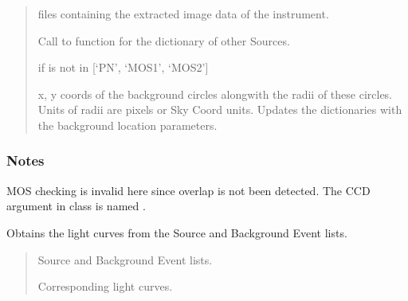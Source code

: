 \documentclass[letterpaper,10pt,english]{sphinxmanual}
\begin{document}
\begin{fulllineitems}
\begin{fulllineitems}
\begin{quote}
\begin{description}
\sphinxAtStartPar
{} files containing the extracted image data of the instrument.

\sphinxAtStartPar
Call to  function for the dictionary of
other Sources.

\sphinxAtStartPar
{} \textendash{} if  is not in {[}‘PN’, ‘MOS1’, ‘MOS2’{]}

\sphinxAtStartPar
x, y coords of the background circles alongwith the radii of these circles.
Units of radii are pixels or Sky Coord units.
Updates the  dictionaries with the background location
parameters.

\end{description}\end{quote}
\subsubsection*{Notes}

\sphinxAtStartPar
{} MOS checking is invalid here since overlap is not been detected.
The CCD argument in  class is named .

\end{fulllineitems}


\begin{fulllineitems}
\label{\detokenize{xmmPipeline:xmmPipeline.epicObj.epicObj.obtain_lightCurves}}
\pysigstartsignatures
{}
\pysigstopsignatures
\sphinxAtStartPar
Obtains the light curves from the Source and Background Event lists.
\begin{quote}\begin{description}
\sphinxAtStartPar
Source and Background Event lists.

\sphinxAtStartPar
Corresponding light curves.

\end{description}\end{quote}


\end{fulllineitems}
\end{fulllineitems}
\end{document}
